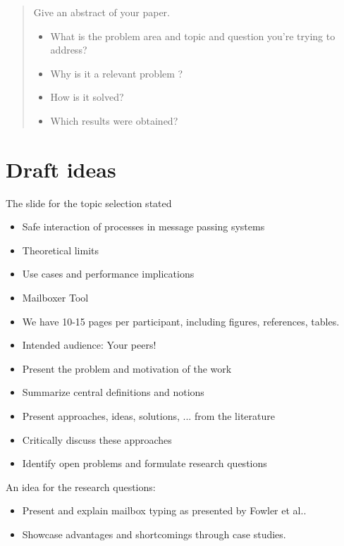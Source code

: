 
\begin{abstract}
    Give an abstract of your paper.
    \begin{itemize}
        \item What is the problem area and topic and question you're trying to address?
        \item Why is it a relevant problem ?
        \item How is it solved?
        \item Which results were obtained?
    \end{itemize}
\end{abstract}


\section{Draft ideas}
The slide for the topic selection stated

\begin{itemize}
    \item Safe interaction of processes in message passing systems
    \item Theoretical limits
    \item Use cases and performance implications
    \item Mailboxer Tool
\end{itemize}

\begin{itemize}
    \item We have 10-15 pages per participant, including figures, references, tables.
    \item Intended audience: Your peers!
    \item Present the problem and motivation of the work
    \item Summarize central definitions and notions
    \item Present approaches, ideas, solutions, ... from the literature
    \item Critically discuss these approaches
    \item Identify open problems and formulate research questions
\end{itemize}

An idea for the research questions:

\begin{itemize}
    \item Present and explain mailbox typing as presented by Fowler et al.\cite{fowlerSpecialDeliveryProgramming2023}.    
    \item Showcase advantages and shortcomings through case studies.
\end{itemize}

